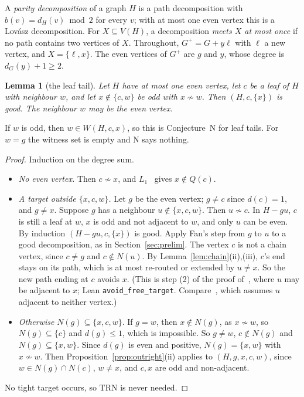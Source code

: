 \documentclass[11pt]{amsart}
\newtheorem{lemma}[theorem]{Lemma}
\theoremstyle{definition}
\newcommand{\lean}[1]{\quad{\footnotesize[Lean: \texttt{#1}]}}
\newcommand{\TRN}{\mathrm{TRN}}
\begin{document}
A \emph{parity decomposition} of a graph $H$ is a path decomposition with $b(v)=d_H(v)\bmod2$ for
every $v$; with at most one even vertex this is a Lov\'asz decomposition. For $X\subseteq V(H)$, a
decomposition \emph{meets $X$ at most once} if no path contains two vertices of $X$. Throughout,
$G^+=G+y\ell$ with $\ell$ a new vertex, and $X=\{\ell,x\}$. The even vertices of $G^+$ are $g$ and
$y$, whose degree is $d_G(y)+1\ge2$.

\begin{lemma}[the leaf tail]\label{lem:leaftail}
Let $H$ have at most one even vertex, let $c$ be a leaf of $H$ with neighbour $w$, and let
$x\notin\{c,w\}$ be odd with $x\not\sim w$. Then $(H,c,\{x\})$ is good. The neighbour $w$ may be the
even vertex.\lean{avoid\_leafTail}
\end{lemma}

If $w$ is odd, then $w\in W(H,c,x)$, so this is Conjecture~N for leaf tails. For $w=g$ the witness
set is empty and N says nothing.

\begin{proof}
Induction on the degree sum.
\begin{itemize}
\item \emph{No even vertex.} Then $c\not\sim x$, and $L_1$~\cite[Thm.~6.3]{RD} gives $x\notin
Q(c)$.
\item \emph{A target outside $\{x,c,w\}$.} Let $g$ be the even vertex; $g\ne c$ since $d(c)=1$, and
$g\ne x$. Suppose $g$ has a neighbour $u\notin\{x,c,w\}$. Then $u\not\sim c$. In $H-gu$, $c$ is still
a leaf at $w$, $x$ is odd and not adjacent to $w$, and only $u$ can be even. By induction
$(H-gu,c,\{x\})$ is good. Apply Fan's step from $g$ to $u$ to a good decomposition, as in
Section~\ref{sec:prelim}. The vertex $c$ is not a chain vertex, since $c\ne g$ and $c\notin N(u)$.
By Lemma~\ref{lem:chain}(ii),(iii), $c$'s end stays on its path, which is at most re-routed or
extended by $u\ne x$. So the new path ending at $c$ avoids $x$. (This is step (2) of the proof
of~\cite[Theorem~4.6]{CN}, where $u$ may be adjacent to $x$; Lean \texttt{avoid\_free\_target}.
Compare~\cite[Prop.~7.1]{DL}, which assumes $u$ adjacent to neither vertex.)
\item \emph{Otherwise} $N(g)\subseteq\{x,c,w\}$. If $g=w$, then $x\notin N(g)$, as $x\not\sim w$, so
$N(g)\subseteq\{c\}$ and $d(g)\le1$, which is impossible. So $g\ne w$, $c\notin N(g)$ and
$N(g)\subseteq\{x,w\}$. Since $d(g)$ is even and positive, $N(g)=\{x,w\}$ with $x\not\sim w$. Then
Proposition~\ref{prop:outright}(ii) applies to $(H,g,x,c,w)$, since $w\in N(g)\cap N(c)$, $w\ne
x$, and $c,x$ are odd and non-adjacent.
\end{itemize}
No tight target occurs, so $\TRN$ is never needed.
\end{proof}
\end{document}
